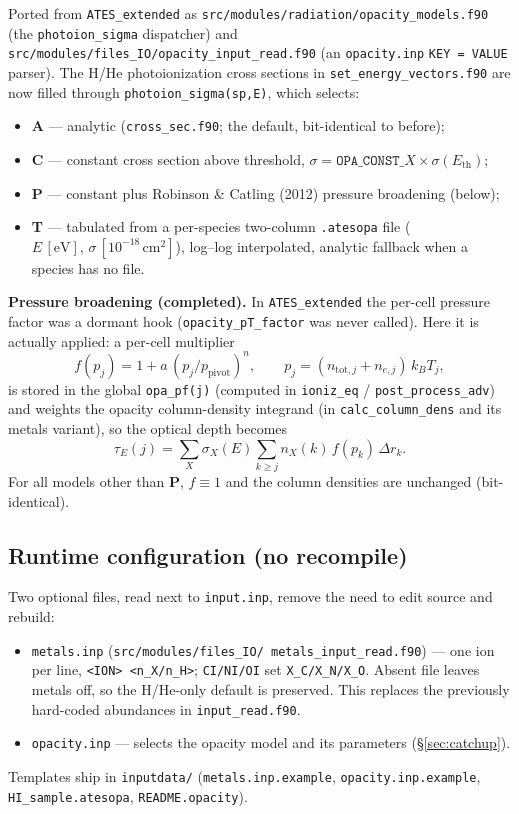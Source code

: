 \documentclass[english,a4paper]{kiseon_memo}
\begin{document}
Ported from \texttt{ATES\_extended} as
\texttt{src/modules/radiation/opacity\_models.f90} (the
\texttt{photoion\_sigma} dispatcher) and
\texttt{src/modules/files\_IO/opacity\_input\_read.f90} (an
\texttt{opacity.inp} \texttt{KEY = VALUE} parser).  The H/He
photoionization cross sections in \texttt{set\_energy\_vectors.f90} are
now filled through \texttt{photoion\_sigma(sp,E)}, which selects:
\begin{itemize}
  \item \textbf{A} --- analytic (\texttt{cross\_sec.f90}; the default,
    bit-identical to before);
  \item \textbf{C} --- constant cross section above threshold,
    \(\sigma = \texttt{OPA\_CONST\_}X\times\sigma(E_\mathrm{th})\);
  \item \textbf{P} --- constant plus Robinson \& Catling (2012)
    pressure broadening (below);
  \item \textbf{T} --- tabulated from a per-species two-column
    \texttt{.atesopa} file (\(E\,[\mathrm{eV}],\,\sigma\,[10^{-18}\,
    \mathrm{cm}^2]\)), log--log interpolated, analytic fallback when a
    species has no file.
\end{itemize}

\textbf{Pressure broadening (completed).}  In \texttt{ATES\_extended}
the per-cell pressure factor was a dormant hook
(\texttt{opacity\_pT\_factor} was never called).  Here it is actually
applied: a per-cell multiplier
\[
  f(p_j) = 1 + a\,(p_j/p_\mathrm{pivot})^{n},
  \qquad p_j = (n_{\mathrm{tot},j}+n_{e,j})\,k_B T_j,
\]
is stored in the global \texttt{opa\_pf(j)} (computed in
\texttt{ioniz\_eq} / \texttt{post\_process\_adv}) and weights the opacity
column-density integrand (in \texttt{calc\_column\_dens} and its metals
variant), so the optical depth becomes
\[
  \tau_E(j)=\sum_X \sigma_X(E)\sum_{k\ge j} n_X(k)\,f(p_k)\,\Delta r_k .
\]
For all models other than \textbf{P}, \(f\equiv 1\) and the column
densities are unchanged (bit-identical).

\subsection{Runtime configuration (no recompile)}

Two optional files, read next to \texttt{input.inp}, remove the need to
edit source and rebuild:
\begin{itemize}
  \item \texttt{metals.inp} (\texttt{src/modules/files\_IO/%
    metals\_input\_read.f90}) --- one ion per line,
    \texttt{<ION> <n\_X/n\_H>}; \texttt{CI/NI/OI} set
    \texttt{X\_C/X\_N/X\_O}.  Absent file leaves metals off, so the
    H/He-only default is preserved.  This replaces the previously
    hard-coded abundances in \texttt{input\_read.f90}.
  \item \texttt{opacity.inp} --- selects the opacity model and its
    parameters (\S\ref{sec:catchup}).
\end{itemize}
\begin{sloppypar}
Templates ship in \texttt{inputdata/} (\texttt{metals.inp.example},
\texttt{opacity.inp.example}, \texttt{HI\_sample.atesopa},
\texttt{README.opacity}).
\end{sloppypar}
\end{document}
